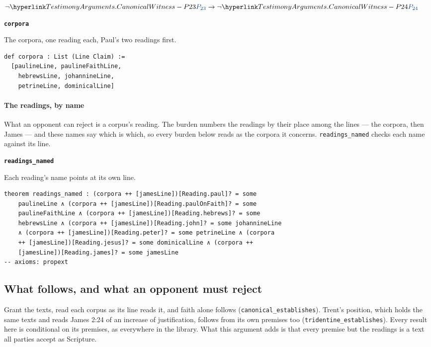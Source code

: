 \documentclass[11pt,paper=\testimonypaper,DIV=13,parskip=false]{scrartcl}
\begin{document}
\begin{derivation}
  \item[] \(\lnot \pvar{TestimonyArguments.CanonicalWitness}{23} \rightarrow \lnot \pvar{TestimonyArguments.CanonicalWitness}{24}\)
\end{derivation}
\par\medskip\noindent\textbf{\texttt{corpora}}\par\nobreak\noindent
The corpora, one reading each, Paul’s two readings first.

{\small\begin{verbatim}
def corpora : List (Line Claim) :=
  [paulineLine, paulineFaithLine,
    hebrewsLine, johannineLine,
    petrineLine, dominicalLine]
\end{verbatim}}
\paragraph*{The readings, by name}
\leavevmode\par\nobreak
What an opponent can reject is a corpus’s reading. The burden numbers the readings by their place among the lines — the corpora, then James — and these names say which is which, so every burden below reads as the corpora it concerns. \texttt{readings\_\allowbreak{}named} checks each name against its line.

\par\medskip\noindent\textbf{\texttt{readings\_\allowbreak{}named}}\par\nobreak\noindent
Each reading’s name points at its own line.

{\small\begin{verbatim}
theorem readings_named : (corpora ++ [jamesLine])[Reading.paul]? = some
    paulineLine ∧ (corpora ++ [jamesLine])[Reading.paulOnFaith]? = some
    paulineFaithLine ∧ (corpora ++ [jamesLine])[Reading.hebrews]? = some
    hebrewsLine ∧ (corpora ++ [jamesLine])[Reading.john]? = some johannineLine
    ∧ (corpora ++ [jamesLine])[Reading.peter]? = some petrineLine ∧ (corpora
    ++ [jamesLine])[Reading.jesus]? = some dominicalLine ∧ (corpora ++
    [jamesLine])[Reading.james]? = some jamesLine
-- axioms: propext
\end{verbatim}}
\subsection*{What follows, and what an opponent must reject}
Grant the texts, read each corpus as its line reads it, and faith alone follows (\texttt{canonical\_\allowbreak{}establishes}). Trent’s position, which holds the same texts and reads James 2:24 of an increase of justification, follows from its own premises too (\texttt{tridentine\_\allowbreak{}establishes}). Every result here is conditional on its premises, as everywhere in the library. What this argument adds is that every premise but the readings is a text all parties accept as Scripture.
\end{document}

